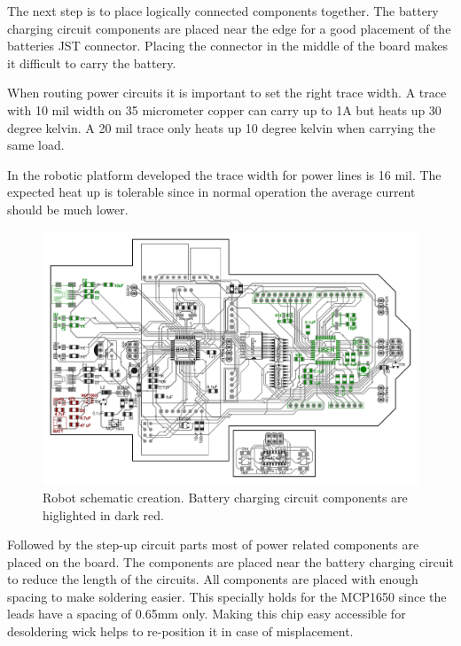 \documentclass[11pt,a4paper]{article}
\begin{document}
The next step is to place logically connected components together. The battery charging circuit components are placed near the edge for a good placement of the batteries JST connector. Placing the connector in the middle of the board makes it difficult to carry the battery.

When routing power circuits it is important to set the right trace width. A trace with 10 mil width on 35 micrometer copper can carry up to 1A but heats up 30 degree kelvin. A 20 mil trace only heats up 10 degree kelvin when carrying the same load. \cite[p. 841]{horowitz1989art} 

In the robotic platform developed the trace width for power lines is 16 mil. The expected heat up is tolerable since in normal operation the average current should be much lower.

\begin{figure}[H]
  \centering
  \includegraphics[width=\textwidth]{robot_schematic_battery.pdf}
  \caption{Robot schematic creation. Battery charging circuit components are higlighted in dark red.}
\end{figure}

Followed by the step-up circuit parts most of power related components are placed on the board. The components are placed near the battery charging circuit to reduce the length of the circuits. All components are placed with enough spacing to make soldering easier. This specially holds for the MCP1650 since the leads have a spacing of 0.65mm only. Making this chip easy accessible for desoldering wick helps to re-position it in case of misplacement. 
\end{document}
